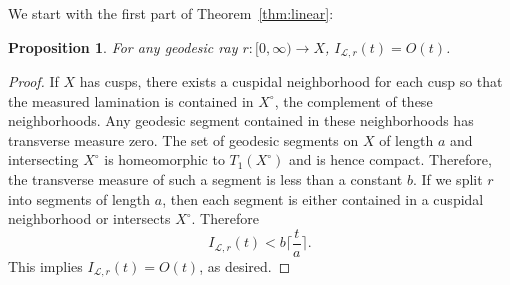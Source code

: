 \documentclass[11pt]{article} %
\theoremstyle{plain}
\newtheorem{prop}[thm]{Proposition}
\theoremstyle{definition}
\numberwithin{equation}{section}
\begin{document}
We start with the first part of Theorem~\ref{thm:linear}:
\begin{prop}\label{linr}
For any geodesic ray $r:[0,\infty)\to X$, $I_{\mathcal{L},r}(t)=O(t)$.
\end{prop}
\begin{proof}
If $X$ has cusps, there exists a cuspidal neighborhood for each cusp so that the measured lamination is contained in $X^\circ$, the complement of these neighborhoods. Any geodesic segment contained in these neighborhoods has transverse measure zero. The set of geodesic segments on $X$ of length $a$ and intersecting $X^\circ$ is homeomorphic to $T_1(X^\circ)$ and is hence compact. Therefore, the transverse measure of such a segment is less than a constant $b$. If we split $r$ into segments of length $a$, then each segment is either contained in a cuspidal neighborhood or intersects $X^\circ$. Therefore
$$I_{\mathcal{L},r}(t) < b \lceil \frac{t}{a} \rceil.$$
This implies $I_{\mathcal{L},r}(t)=O(t)$, as desired.
\end{proof}
\end{document}
